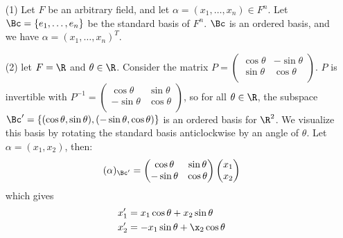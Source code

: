 \begin{example}
    \begin{enumerate}
        \item[(1)] Let $F$ be an arbitrary field, and let  $\alpha=(x_1, \dots, x_n) \in F^n$. Let
            $\Bc=\{e_1, \dots, e_n\}$ be the standard basis of $F^n$.  $\Bc$ is an ordered basis,
            and we have  $\alpha=(x_1, \dots, x_n)^T$.

        \item[(2)] let $F=\R$ and  $\theta \in \R$. Consider the matrix
            $P=\begin{pmatrix}
                \cos{\theta} & -\sin{\theta} \\
                \sin{\theta} & \cos{\theta} \\
               \end{pmatrix}$. $P$ is invertible with 
               $P^{-1}=\begin{pmatrix}
                   \cos{\theta} & \sin{\theta} \\
                -\sin{\theta} & \cos{\theta} \\
            \end{pmatrix}$, so for all $\theta \in \R$, the subspace  $\Bc'=\{(\cos{\theta},
            \sin{\theta}), (-\sin{\theta}, \cos{\theta})\}$ is an ordered basis for $\R^2$. We
            visualize this basis by rotating the standard basis anticlockwise by an angle of
            $\theta$. Let $\alpha=(x_1,x_2)$, then:
                \begin{equation*}
                    (\alpha)_{\Bc'}=\begin{pmatrix}
                                \cos{\theta} & \sin{\theta} \\
                                -\sin{\theta} & \cos{\theta}
                               \end{pmatrix}
                               \begin{pmatrix}
                                x_1 \\
                                x_2 \\
                               \end{pmatrix}
                \end{equation*}
            which gives
                \begin{align*}
                    x_1'    &=  x_1\cos{\theta}+x_2\sin{\theta} \\
                    x_2'    &=  -x_1\sin{\theta}+\x_2\cos{\theta} \\
                \end{align*}


\end{enumerate}
\end{example}
